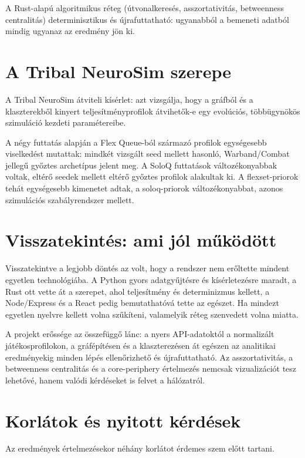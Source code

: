 A Rust-alapú algoritmikus réteg (útvonalkeresés, asszortativitás, betweenness centralitás) determinisztikus és újrafuttatható: ugyanabból a bemeneti adatból mindig ugyanaz az eredmény jön ki.

\section{A Tribal NeuroSim szerepe}

A Tribal NeuroSim átviteli kísérlet: azt vizsgálja, hogy a gráfból és a klaszterekből kinyert teljesítményprofilok átvihetők-e egy evolúciós, többügynökös szimuláció kezdeti paramétereibe.

A négy futtatás alapján a Flex Queue-ból származó profilok egységesebb viselkedést mutattak: mindkét vizsgált seed mellett hasonló, Warband/Combat jellegű győztes archetípus jelent meg. A SoloQ futtatások változékonyabbak voltak, eltérő seedek mellett eltérő győztes profilok alakultak ki. A flexset-priorok tehát egységesebb kimenetet adtak, a soloq-priorok változékonyabbat, azonos szimulációs szabályrendszer mellett.

\section{Visszatekintés: ami jól működött}

Visszatekintve a legjobb döntés az volt, hogy a rendszer nem erőltette mindent egyetlen technológiába. A Python gyors adatgyűjtésre és kísérletezésre maradt, a Rust ott vette át a szerepet, ahol teljesítmény és determinizmus kellett, a Node/Express és a React pedig bemutathatóvá tette az egészet. Ha mindezt egyetlen nyelvre kellett volna szűkíteni, valamelyik réteg szenvedett volna miatta.

A projekt erőssége az összefüggő lánc: a nyers API-adatoktól a normalizált játékosprofilokon, a gráfépítésen és a klaszterezésen át egészen az analitikai eredményekig minden lépés ellenőrizhető és újrafuttatható. Az asszortativitás, a betweenness centralitás és a core-periphery értelmezés nemcsak vizualizációt tesz lehetővé, hanem valódi kérdéseket is felvet a hálózatról.

\section{Korlátok és nyitott kérdések}

Az eredmények értelmezésekor néhány korlátot érdemes szem előtt tartani.

